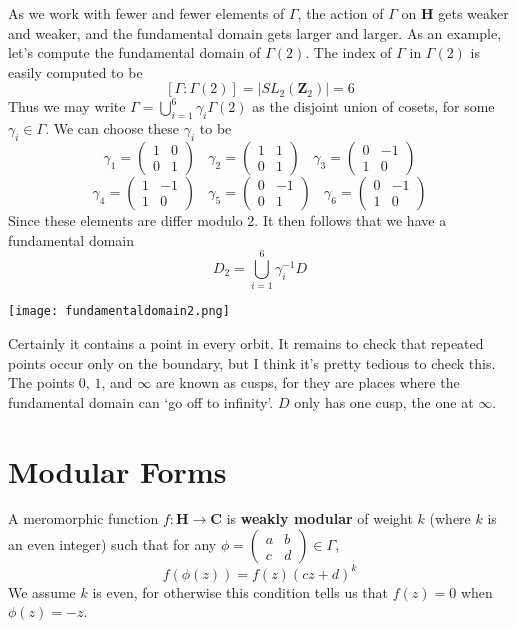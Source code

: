 As we work with fewer and fewer elements of $\Gamma$, the action of $\Gamma$ on $\mathbf{H}$ gets weaker and weaker, and the fundamental domain gets larger and larger. As an example, let's compute the fundamental domain of $\Gamma(2)$. The index of $\Gamma$ in $\Gamma(2)$ is easily computed to be
%
\[ [\Gamma: \Gamma(2)] = |SL_2(\mathbf{Z}_2)| = 6 \]
%
Thus we may write $\Gamma = \bigcup_{i = 1}^6 \gamma_i \Gamma(2)$ as the disjoint union of cosets, for some $\gamma_i \in \Gamma$. We can choose these $\gamma_i$ to be
%
\[ \gamma_1 =  \begin{pmatrix} 1 & 0 \\ 0 & 1 \end{pmatrix}\ \ \ \ \gamma_2 =  \begin{pmatrix} 1 & 1 \\ 0 & 1 \end{pmatrix}\ \ \ \ \gamma_3 =  \begin{pmatrix} 0 & -1 \\ 1 & 0 \end{pmatrix} \]
\[ \gamma_4 =  \begin{pmatrix} 1 & -1 \\ 1 & 0 \end{pmatrix}\ \ \ \ \gamma_5 =  \begin{pmatrix} 0 & -1 \\ 0 & 1 \end{pmatrix}\ \ \ \ \gamma_6 =  \begin{pmatrix} 0 & -1 \\ 1 & 0 \end{pmatrix} \]
%
Since these elements are differ modulo $2$. It then follows that we have a fundamental domain
%
\[ D_2 = \bigcup_{i = 1}^6 \gamma_i^{-1} D \]
%
\begin{center}
\texttt{[image: fundamentaldomain2.png]}
\end{center}
%
Certainly it contains a point in every orbit. It remains to check that repeated points occur only on the boundary, but I think it's pretty tedious to check this. The points $0$, $1$, and $\infty$ are known as cusps, for they are places where the fundamental domain can `go off to infinity'. $D$ only has one cusp, the one at $\infty$.

\section{Modular Forms}

A meromorphic function $f: \mathbf{H} \to \mathbf{C}$ is {\bf weakly modular} of weight $k$ (where $k$ is an even integer) such that for any $\phi = \left(\begin{smallmatrix} a & b \\ c & d \end{smallmatrix}\right) \in \Gamma$,
%
\[ f(\phi(z)) = f(z) (cz + d)^k \]
%
We assume $k$ is even, for otherwise this condition tells us that $f(z) = 0$ when $\phi(z) = -z$.

